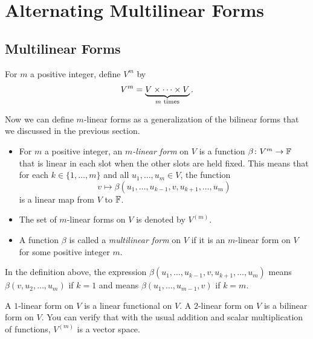 \iftestbuild %
\setcounter{section}{1}\setcounter{theorem}{23}
\fi %
\section{Alternating Multilinear Forms}

\subsection{Multilinear Forms}

\begin{definition}[$V^m$]\label{ax:9.24}
For $m$ a positive integer, define $V^m$ by
\[ V^m = \underbrace{V\times\cdots\times V}_{m\text{ times}}. \]
\end{definition}

Now we can define $m$-linear forms as a generalization of the bilinear forms
that we discussed in the previous section.

\begin{definition}\label{ax:9.25}\leavevmode
\begin{itemize}
\item For $m$ a positive integer, an \emph{$m$-linear form} on $V$ is a
  function $\beta\colon V^m\to\mathbb{F}$ that is linear in each slot when the other
  slots are held fixed. This means that for each $k\in\{1,\dots,m\}$ and all
  $u_1,\dots,u_m\in V$, the function
  \[ v\mapsto\beta(u_1,\dots,u_{k-1},v,u_{k+1},\dots,u_m) \]
  is a linear map from $V$ to $\mathbb{F}$.
\item The set of $m$-linear forms on $V$ is denoted by $V^{(m)}$.
\item A function $\beta$ is called a \emph{multilinear form} on $V$ if it is an
  $m$-linear form on $V$ for some positive integer $m$.
\end{itemize}
\end{definition}

In the definition above, the expression
$\beta(u_1,\dots,u_{k-1},v,\allowbreak u_{k+1},\dots,u_m)$ means
$\beta(v,\allowbreak u_2,\dots,u_m)$
if $k=1$ and means $\beta(u_1,\dots,u_{m-1},v)$ if $k=m$.

A $1$-linear form on $V$ is a linear functional on $V$. A $2$-linear form on
$V$ is a bilinear form on $V$. You can verify that with the usual addition and
scalar multiplication of functions, $V^{(m)}$ is a vector space.

